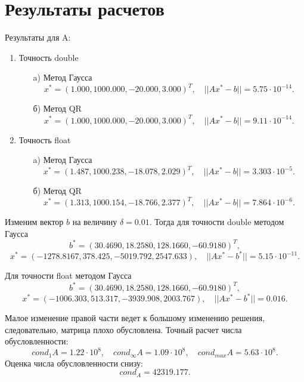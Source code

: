 \documentclass[12pt, a4paper]{article}
\begin{document}
\section{Результаты расчетов}
Результаты для A:
\begin{enumerate}
\item Точность double
	\begin{enumerate}
	\item[a)] Метод Гаусса
	$$x^* = (1{.}000 , 1000{.}000, -20{.}000 ,3{.}000)^{T},\quad ||Ax^{*}-b|| = 5{.}75\cdot10^{-14}.$$
	\item[б)] Метод QR
	$$x^* = (1{.}000 , 1000{.}000, -20{.}000 ,3{.}000)^{T},\quad ||Ax^{*}-b|| = 9{.}11\cdot10^{-14}.$$
	\end{enumerate}
\item Точность float
	\begin{enumerate}
	\item[a)] Метод Гаусса
	$$x^* = (1{.}487 , 1000{.}238, -18{.}078 ,2{.}029)^{T},\quad ||Ax^{*}-b|| = 3{.}303\cdot10^{-5}.$$
	\item[б)] Метод QR
$$x^* = (1{.}313 , 1000{.}154, -18{.}766 ,2{.}377)^{T},\quad ||Ax^{*}-b|| = 7{.}864\cdot10^{-6}.$$
	\end{enumerate}
\end{enumerate}
Изменим вектор $b$ на величину $\delta = 0.01$. Тогда для точности double методом Гаусса
$$b^* = (30.4690, 18{.}2580, 128{.}1660, -60{.}9180)^T,$$
$$x^* = (-1278{.}8167, 378{.}425, -5019{.}792, 2547{.}633), \quad ||Ax^{*}-b^*|| =  5{.}15\cdot10^{-11}.$$

Для точности float методом Гаусса
$$b^* = (30.4690, 18{.}2580, 128{.}1660, -60{.}9180)^T,$$
$$x^* = (-1006{.}303, 513{.}317, -3939{.}908, 2003{.}767), \quad ||Ax^{*}-b^*|| =  0{.}016.$$

Малое изменение правой части ведет к большому изменению решения, следовательно, матрица плохо обусловлена. Точный расчет числа обусловленности: 
$$cond_1A = 1{.}22\cdot10^8,\quad cond_{\infty}A = 1{.}09\cdot10^8, \quad cond_{max}A = 5{.}63\cdot10^8 .$$ 
Оценка числа обусловленности снизу:
$$cond_A = 42319{.}177.$$
\end{document}
